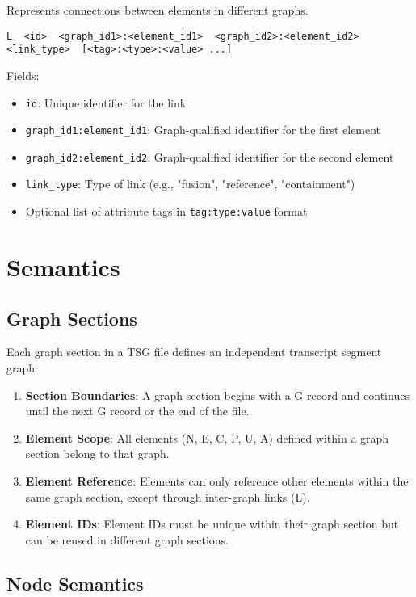 \documentclass{article}
\begin{document}
Represents connections between elements in different graphs.

\begin{lstlisting}
L  <id>  <graph_id1>:<element_id1>  <graph_id2>:<element_id2>  <link_type>  [<tag>:<type>:<value> ...]
\end{lstlisting}

Fields:
\begin{itemize}
	\item \texttt{id}: Unique identifier for the link
	\item \texttt{graph\_id1:element\_id1}: Graph-qualified identifier for the first element
	\item \texttt{graph\_id2:element\_id2}: Graph-qualified identifier for the second element
	\item \texttt{link\_type}: Type of link (e.g., "fusion", "reference", "containment")
	\item Optional list of attribute tags in \texttt{tag:type:value} format
\end{itemize}

\section{Semantics}

\subsection{Graph Sections}

Each graph section in a TSG file defines an independent transcript segment graph:

\begin{enumerate}
	\item \textbf{Section Boundaries}: A graph section begins with a G record and continues until the next G record or the end of the file.
	\item \textbf{Element Scope}: All elements (N, E, C, P, U, A) defined within a graph section belong to that graph.
	\item \textbf{Element Reference}: Elements can only reference other elements within the same graph section, except through inter-graph links (L).
	\item \textbf{Element IDs}: Element IDs must be unique within their graph section but can be reused in different graph sections.
\end{enumerate}

\subsection{Node Semantics}
\end{document}
